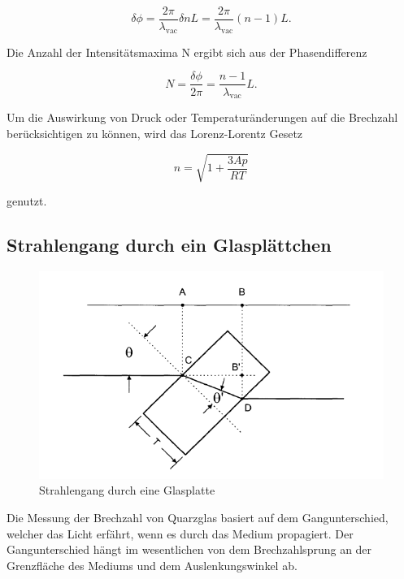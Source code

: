 \begin{equation}
\delta \phi = \frac{2 \pi}{\lambda_\text{vac}} \delta n L = \frac{2 \pi}{\lambda_\text{vac}} (n - 1)L.
\end{equation}

Die Anzahl der Intensitätsmaxima N ergibt sich aus der Phasendifferenz

\begin{equation}
N=\frac{\delta \phi}{2 \pi} = \frac{n-1}{\lambda_\text{vac}} L.
\end{equation}

Um die Auswirkung von Druck oder Temperaturänderungen auf die Brechzahl berücksichtigen zu können, wird das Lorenz-Lorentz Gesetz

\begin{equation}
	n = \sqrt{1 + \frac{3Ap}{RT}}
	\label{n_gas}
\end{equation}

genutzt.

\subsection{Strahlengang durch ein Glasplättchen}

\begin{figure}[h]
\centering
\includegraphics[scale=0.8]{img/glasPlatte.PNG}
\caption{Strahlengang durch eine Glasplatte \cite{FP}}
\label{Glasplatte}
\end{figure}

Die Messung der Brechzahl von Quarzglas basiert auf dem Gangunterschied, welcher das Licht erfährt, wenn es durch das Medium propagiert.
Der Gangunterschied hängt im wesentlichen von dem Brechzahlsprung an der Grenzfläche des Mediums und dem Auslenkungswinkel ab.

